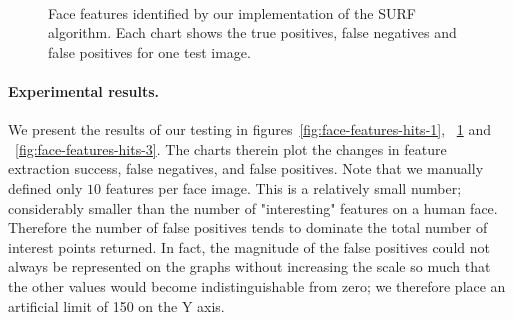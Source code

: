 \begin{figure} [h]
  \centering
  \\
  \caption[Face features identified by our SURF implementation (images 3 \& 4)]{Face features identified by our implementation of the SURF algorithm. Each chart shows the true positives, false negatives and false positives for one test image.}
  \label{fig:face-features-hits-2}
\end{figure}

\paragraph{Experimental results.}
We present the results of our testing in figures~\ref{fig:face-features-hits-1}, ~\ref{fig:face-features-hits-2} and ~\ref{fig:face-features-hits-3}. The charts therein plot the changes in feature extraction success, false negatives, and false positives. Note that we manually defined only $10$ features per face image. This is a relatively small number; considerably smaller than the number of "interesting" features on a human face. Therefore the number of false positives tends to dominate the total number of interest points returned. In fact, the magnitude of the false positives could not always be represented on the graphs without increasing the scale so much that the other values would become indistinguishable from zero; we therefore place an artificial limit of 150 on the Y axis.

